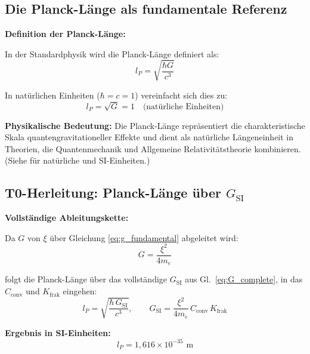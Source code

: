 	\subsection{Die Planck-Länge als fundamentale Referenz}
	
	\begin{derivation}
		\textbf{Definition der Planck-Länge:}
		
		In der Standardphysik wird die Planck-Länge definiert als:
		\begin{equation}
			l_P = \sqrt{\frac{\hbar G}{c^3}}
			\label{eq:planck_length_standard}
		\end{equation}
		
		In natürlichen Einheiten ($\hbar = c = 1$) vereinfacht sich dies zu:
		\begin{equation}
			\boxed{l_P = \sqrt{G} = 1 \quad \text{(natürliche Einheiten)}}
			\label{eq:planck_natural}
		\end{equation}
		
		\textbf{Physikalische Bedeutung:} Die Planck-Länge repräsentiert die charakteristische Skala quantengravitationeller Effekte und dient als natürliche Längeneinheit in Theorien, die Quantenmechanik und Allgemeine Relativitätstheorie kombinieren. (Siehe \cite{T0_nat-si_De} für natürliche und SI-Einheiten.)
	\end{derivation}
	
	\subsection{T0-Herleitung: Planck-Länge über $G_{\text{SI}}$}
	
	\begin{keyresult}
		\textbf{Vollständige Ableitungskette:}
		
		Da $G$ von $\xi$ über Gleichung \eqref{eq:g_fundamental} abgeleitet wird:
		\begin{equation}
			G = \frac{\xi^2}{4 m_e}
		\end{equation}
		
		folgt die Planck-Länge über das vollständige $G_{\text{SI}}$ aus Gl.~\eqref{eq:G_complete}, in das $C_{\text{conv}}$ und $K_{\text{frak}}$ eingehen:
		\begin{equation}
			l_P = \sqrt{\frac{\hbar\,G_{\text{SI}}}{c^3}}, \qquad G_{\text{SI}} = \frac{\xi^2}{4 m_e}\,C_{\text{conv}}\,K_{\text{frak}}
		\end{equation}

		\textbf{Ergebnis in SI-Einheiten:}
		\begin{equation}
			\boxed{l_P = 1{,}616 \times 10^{-35} \text{ m}}
		\end{equation}

	\end{keyresult}
	
